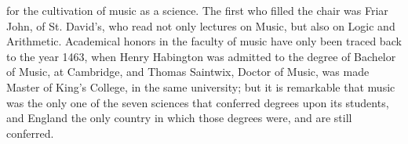 for the cultivation of music 
as a science. The first who filled the chair was Friar John, of St. David’s, who
read not only lectures on Music, but also on Logic and Arithmetic. Academical
honors in the faculty of music have only been traced back to the year 1463, when
Henry Habington was admitted to the degree of Bachelor of Music, at Cambridge,
and Thomas Saintwix, Doctor of Music, was made Master of King’s College, in
the same university; but it is remarkable that music was the only one of the
seven sciences that conferred degrees upon its students, and England the only
country in which those degrees were, and are still conferred.

\renewcommand\versoheader{music in england, time of henry ii.}
\renewcommand\rectoheader{giraldus cambrensis’ account.}

